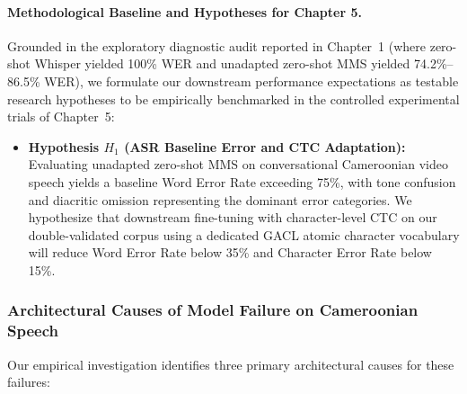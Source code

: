 \documentclass[a4paper,11pt]{article}
\begin{document}
\paragraph{Methodological Baseline and Hypotheses for Chapter 5.}
Grounded in the exploratory diagnostic audit reported in Chapter~1 (where zero-shot Whisper yielded 100\% WER and unadapted zero-shot MMS yielded 74.2\%--86.5\% WER), we formulate our downstream performance expectations as testable research hypotheses to be empirically benchmarked in the controlled experimental trials of Chapter~5:
\begin{itemize}
    \item \textbf{Hypothesis $H_1$ (ASR Baseline Error and CTC Adaptation):} Evaluating unadapted zero-shot MMS on conversational Cameroonian video speech yields a baseline Word Error Rate exceeding 75\%, with tone confusion and diacritic omission representing the dominant error categories. We hypothesize that downstream fine-tuning with character-level CTC on our double-validated corpus using a dedicated GACL atomic character vocabulary will reduce Word Error Rate below 35\% and Character Error Rate below 15\%.
\end{itemize}

\subsubsection{Architectural Causes of Model Failure on Cameroonian Speech}
\label{sec:chap2_asr_failures}
Our empirical investigation identifies three primary architectural causes for these failures:
\end{document}
